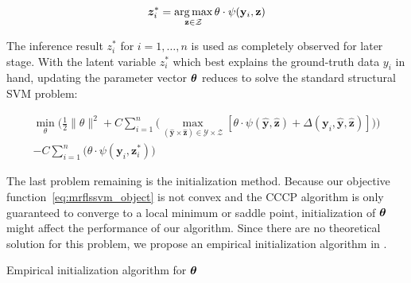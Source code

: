 \begin{align}
  {\bm{z}}_i^*=\operatorname*{arg\,max}_{\mathbf{z} \in \mathcal{Z}} \theta \cdot
  \psi(\mathbf{y}_i,\mathbf{z})
\end{align}

The inference result $z_i^*$ for $i=1,\dots,n$ is used as
completely observed for later stage. With the latent variable
$z_i^*$ which best explains the ground-truth data $y_i$ in hand,
updating the parameter vector ${\bm{\theta}}$ reduces to solve the
standard structural SVM problem:

\begin{align}
\label{eq:mrflssvm_object}
  \min_\theta\bigg(\frac{1}{2}\|\theta\|^2+
  C\sum_{i=1}^{n}\big(\max_{(\mathbf{\hat{y}} \times
  \mathbf{\hat{z}}) \in \mathcal{Y} \times \mathcal{Z}}
  [\theta\cdot\psi(\mathbf{\hat{y}},\mathbf{\hat{z}}) +
  \Delta(\mathbf{y}_i,\mathbf{\hat{y}},\mathbf{\hat{z}})]\big)\bigg)\\
  -C\sum_{i=1}^{n}\big(\theta \cdot
  \psi(\mathbf{y}_i,\mathbf{z}_i^*)\big) \nonumber
\end{align}

The last problem remaining is the initialization method. Because
our objective function~\eqref{eq:mrflssvm_object} is not convex
and the CCCP algorithm is only guaranteed to converge to a local
minimum or saddle point\cite{yuille2002concave}, initialization
of ${\bm{\theta}}$ might affect the performance of our algorithm. Since
there are no theoretical solution for this problem, we propose an
empirical initialization algorithm in .

\begin{algorithm}[ht]
  \begin{algorithmic}[1]
       
    \ENDIF
    \ENDFOR
     
  \end{algorithmic}
  \caption{\label{alg:init_theta} Empirical initialization
    algorithm for ${\bm{\theta}}$}
\end{algorithm}

